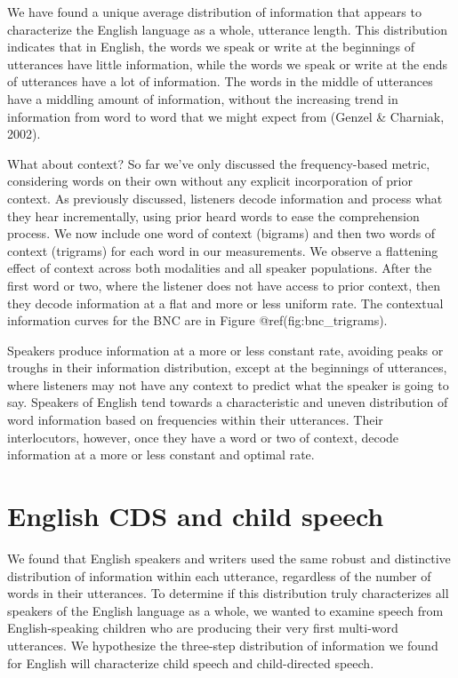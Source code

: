 \documentclass[man,floatsintext]{apa6}
\begin{document}
We have found a unique average distribution of information that appears to characterize the English language as a whole, utterance length. This distribution indicates that in English, the words we speak or write at the beginnings of utterances have little information, while the words we speak or write at the ends of utterances have a lot of information. The words in the middle of utterances have a middling amount of information, without the increasing trend in information from word to word that we might expect from (Genzel \& Charniak, 2002).

What about context? So far we've only discussed the frequency-based metric, considering words on their own without any explicit incorporation of prior context. As previously discussed, listeners decode information and process what they hear incrementally, using prior heard words to ease the comprehension process. We now include one word of context (bigrams) and then two words of context (trigrams) for each word in our measurements. We observe a flattening effect of context across both modalities and all speaker populations. After the first word or two, where the listener does not have access to prior context, then they decode information at a flat and more or less uniform rate. The contextual information curves for the BNC are in Figure @ref(fig:bnc\_trigrams).

Speakers produce information at a more or less constant rate, avoiding peaks or troughs in their information distribution, except at the beginnings of utterances, where listeners may not have any context to predict what the speaker is going to say. Speakers of English tend towards a characteristic and uneven distribution of word information based on frequencies within their utterances. Their interlocutors, however, once they have a word or two of context, decode information at a more or less constant and optimal rate.

\hypertarget{english-cds-and-child-speech}{%
\section{English CDS and child speech}\label{english-cds-and-child-speech}}

We found that English speakers and writers used the same robust and distinctive distribution of information within each utterance, regardless of the number of words in their utterances. To determine if this distribution truly characterizes all speakers of the English language as a whole, we wanted to examine speech from English-speaking children who are producing their very first multi-word utterances. We hypothesize the three-step distribution of information we found for English will characterize child speech and child-directed speech.
\end{document}
